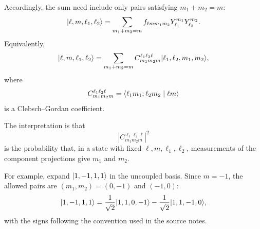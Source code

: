 Accordingly, the sum need include only pairs satisfying $m_1+m_2=m$:
\begin{equation}
  \lvert \ell,m,\ell_1,\ell_2\rangle
  =\sum_{m_1+m_2=m}
  f_{\ell m m_1m_2}
  Y_{\ell_1}^{m_1}Y_{\ell_2}^{m_2}.
  \label{eq:qam-coupled-expansion}
\end{equation}
Equivalently,
\begin{equation}
  \lvert \ell,m,\ell_1,\ell_2\rangle
  =\sum_{m_1+m_2=m}
  C_{m_1m_2m}^{\ell_1\ell_2\ell}
  \lvert \ell_1,\ell_2,m_1,m_2\rangle,
  \label{eq:qam-cg-expansion}
\end{equation}
where
\[
  C_{m_1m_2m}^{\ell_1\ell_2\ell}
  =\langle \ell_1m_1;\ell_2m_2\mid\ell m\rangle
\]
is a Clebsch--Gordan coefficient.

The interpretation is that
\[
  \left|C_{m_1m_2m}^{\ell_1\ell_2\ell}\right|^2
\]
is the probability that, in a state with fixed $\ell,m,\ell_1,\ell_2$, measurements of the component projections give $m_1$ and $m_2$.

For example, expand $\lvert 1,-1,1,1\rangle$ in the uncoupled basis.  Since $m=-1$, the allowed pairs are $(m_1,m_2)=(0,-1)$ and $(-1,0)$:
\[
  \lvert 1,-1,1,1\rangle
  =\frac{1}{\sqrt2}\lvert 1,1,0,-1\rangle
  -\frac{1}{\sqrt2}\lvert 1,1,-1,0\rangle,
\]
with the signs following the convention used in the source notes.
